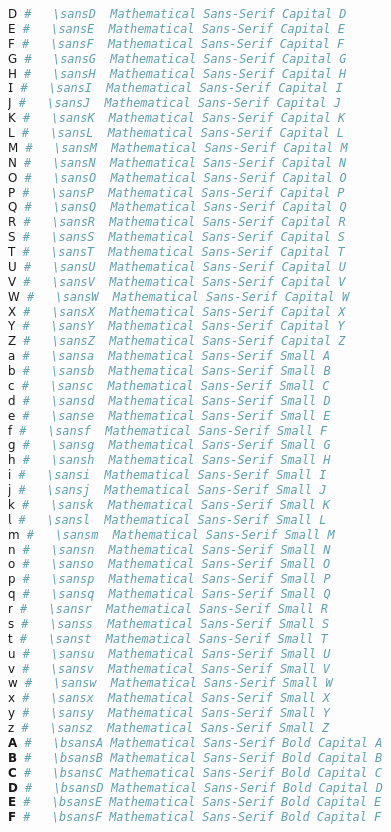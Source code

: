 \begin{lstlisting}[language=Julia, style=julia]
𝖣 #   \sansD  Mathematical Sans-Serif Capital D
𝖤 #   \sansE  Mathematical Sans-Serif Capital E
𝖥 #   \sansF  Mathematical Sans-Serif Capital F
𝖦 #   \sansG  Mathematical Sans-Serif Capital G
𝖧 #   \sansH  Mathematical Sans-Serif Capital H
𝖨 #   \sansI  Mathematical Sans-Serif Capital I
𝖩 #   \sansJ  Mathematical Sans-Serif Capital J
𝖪 #   \sansK  Mathematical Sans-Serif Capital K
𝖫 #   \sansL  Mathematical Sans-Serif Capital L
𝖬 #   \sansM  Mathematical Sans-Serif Capital M
𝖭 #   \sansN  Mathematical Sans-Serif Capital N
𝖮 #   \sansO  Mathematical Sans-Serif Capital O
𝖯 #   \sansP  Mathematical Sans-Serif Capital P
𝖰 #   \sansQ  Mathematical Sans-Serif Capital Q
𝖱 #   \sansR  Mathematical Sans-Serif Capital R
𝖲 #   \sansS  Mathematical Sans-Serif Capital S
𝖳 #   \sansT  Mathematical Sans-Serif Capital T
𝖴 #   \sansU  Mathematical Sans-Serif Capital U
𝖵 #   \sansV  Mathematical Sans-Serif Capital V
𝖶 #   \sansW  Mathematical Sans-Serif Capital W
𝖷 #   \sansX  Mathematical Sans-Serif Capital X
𝖸 #   \sansY  Mathematical Sans-Serif Capital Y
𝖹 #   \sansZ  Mathematical Sans-Serif Capital Z
𝖺 #   \sansa  Mathematical Sans-Serif Small A
𝖻 #   \sansb  Mathematical Sans-Serif Small B
𝖼 #   \sansc  Mathematical Sans-Serif Small C
𝖽 #   \sansd  Mathematical Sans-Serif Small D
𝖾 #   \sanse  Mathematical Sans-Serif Small E
𝖿 #   \sansf  Mathematical Sans-Serif Small F
𝗀 #   \sansg  Mathematical Sans-Serif Small G
𝗁 #   \sansh  Mathematical Sans-Serif Small H
𝗂 #   \sansi  Mathematical Sans-Serif Small I
𝗃 #   \sansj  Mathematical Sans-Serif Small J
𝗄 #   \sansk  Mathematical Sans-Serif Small K
𝗅 #   \sansl  Mathematical Sans-Serif Small L
𝗆 #   \sansm  Mathematical Sans-Serif Small M
𝗇 #   \sansn  Mathematical Sans-Serif Small N
𝗈 #   \sanso  Mathematical Sans-Serif Small O
𝗉 #   \sansp  Mathematical Sans-Serif Small P
𝗊 #   \sansq  Mathematical Sans-Serif Small Q
𝗋 #   \sansr  Mathematical Sans-Serif Small R
𝗌 #   \sanss  Mathematical Sans-Serif Small S
𝗍 #   \sanst  Mathematical Sans-Serif Small T
𝗎 #   \sansu  Mathematical Sans-Serif Small U
𝗏 #   \sansv  Mathematical Sans-Serif Small V
𝗐 #   \sansw  Mathematical Sans-Serif Small W
𝗑 #   \sansx  Mathematical Sans-Serif Small X
𝗒 #   \sansy  Mathematical Sans-Serif Small Y
𝗓 #   \sansz  Mathematical Sans-Serif Small Z
𝗔 #   \bsansA Mathematical Sans-Serif Bold Capital A
𝗕 #   \bsansB Mathematical Sans-Serif Bold Capital B
𝗖 #   \bsansC Mathematical Sans-Serif Bold Capital C
𝗗 #   \bsansD Mathematical Sans-Serif Bold Capital D
𝗘 #   \bsansE Mathematical Sans-Serif Bold Capital E
𝗙 #   \bsansF Mathematical Sans-Serif Bold Capital F

\end{lstlisting}
